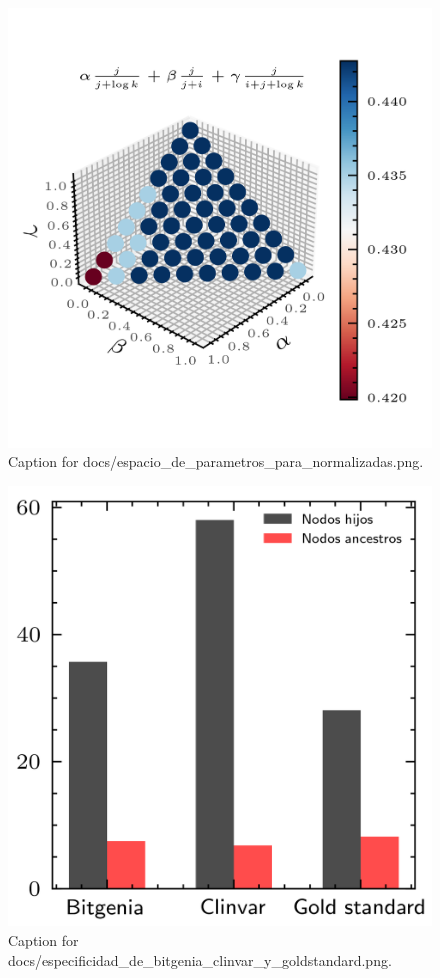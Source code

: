 \documentclass{article}
\begin{document}
\begin{figure}[h] \centering \includegraphics{docs/espacio_de_parametros_para_normalizadas.png} \caption{Caption for docs/espacio_de_parametros_para_normalizadas.png.} \end{figure}
\begin{figure}[h] \centering \includegraphics{docs/especificidad_de_bitgenia_clinvar_y_goldstandard.png} \caption{Caption for docs/especificidad_de_bitgenia_clinvar_y_goldstandard.png.} \end{figure}
\end{document}
